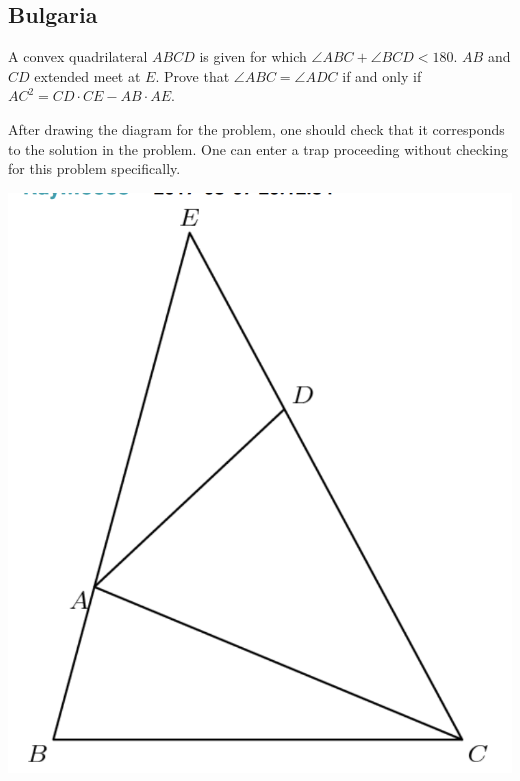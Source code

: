 \documentclass[12pt]{scrartcl}
\newcommand{\<}{\langle}
\renewcommand{\>}{\rangle}
\begin{document}
\subsection{Bulgaria}
\begin{Prob}[Bulgaria] A convex quadrilateral $ABCD$ is given for which $\angle ABC + \angle BCD < 180$.  $AB$ and $CD$ extended meet at $E$.  Prove that $\angle ABC = \angle ADC$ if and only if $AC^2= CD \cdot CE - AB \cdot AE$.
\end{Prob} 
\begin{remark} After drawing the diagram for the problem, one should check that it corresponds to the solution in the problem.  One can enter a trap proceeding without checking for this problem specifically.
\end{remark}
\begin{center}
\includegraphics[scale=0.4]{graphics/p2-3.png}
\end{center}
\end{document}
